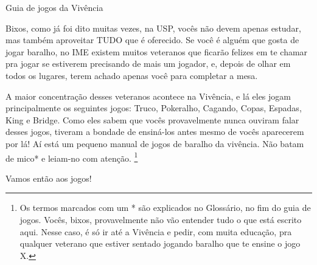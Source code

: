 \begin{secao}{Guia de jogos da Vivência }

Bixos, como já foi dito muitas vezes, na USP, vocês não devem apenas estudar, mas
também aproveitar TUDO que é oferecido. Se você é alguém que gosta de jogar
baralho, no IME existem muitos veteranos que ficarão felizes em te chamar pra
jogar se estiverem precisando de mais um jogador, e, depois de olhar em todos
os lugares, terem achado apenas você para completar a mesa. 

A maior concentração desses veteranos acontece na Vivência, e lá eles jogam
principalmente os seguintes jogos: Truco, Pokeralho, Cagando, Copas, Espadas,
King e Bridge. Como eles sabem que vocês provavelmente nunca ouviram falar desses jogos,
tiveram a bondade de ensiná-los antes mesmo de vocês aparecerem por lá! Aí está um
pequeno manual de jogos de baralho da vivência. Não batam de mico* e
leiam-no com atenção. \footnote{Os termos marcados com um * são explicados no Glossário, no fim do guia de
jogos. Vocês, bixos, provavelmente não vão entender tudo o que está escrito aqui.
Nesse caso, é só ir até a Vivência e pedir, com muita educação, pra qualquer 
veterano que estiver sentado jogando baralho que te ensine o jogo X.}

Vamos então aos jogos!










\end{secao}
